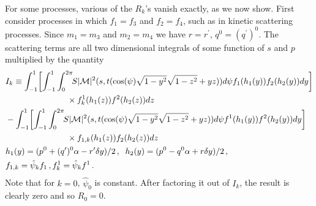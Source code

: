 For some processes, various of the $R_k$'s vanish exactly, as we now show. First consider processes in which $f_1=f_3$ and $f_2=f_4$, such as in kinetic scattering processes. Since $m_1=m_3$ and $m_2=m_4$ we have $r=r^{\prime}$, $q^0=(q^{\prime})^0$.  The scattering terms are all two dimensional integrals of some function of $s$ and $p$ multiplied by the quantity
\begin{align}
&I_k
\equiv\int_{-1}^1\! \left[\int_{-1}^1\int_0^{2\pi}\!\!S|\mathcal{M}|^2 (s,t(\cos(\psi)\sqrt{1-y^2}\sqrt{1-z^2}+yz))d\psi f_1(h_1(y))f_2(h_2(y)) dy\right]\\
&\hspace{26mm}\times f_k^1(h_1(z))f^2(h_2(z))dz\notag\\
&-\int_{-1}^1 \!\left[\int_{-1}^1\int_0^{2\pi}\!\!S|\mathcal{M}|^2 (s,t(\cos(\psi)\sqrt{1-y^2}\sqrt{1-z^2}+yz))d\psi f^1(h_1(y))f^2(h_2(y)) dy\right] \notag\\
&\hspace{26mm}\times f_{1,k}(h_1(z))f_2(h_2(z))dz\notag\\
&h_1(y)=(p^0+(q^{\prime})^0\alpha-r^{\prime}\delta y)/2\,,\hspace{2mm} h_2(y)=(p^0-q^0\alpha+r\delta y)/2\,,\notag\\
&f_{1,k}=\hat\psi_k f_1\,, f^1_k=\hat\psi_k f^1\,.\notag
\end{align}
Note that for $k=0$, $\hat\psi_0$ is constant.  After factoring it out of $I_k$, the result is clearly zero and so $R_0=0$.  

